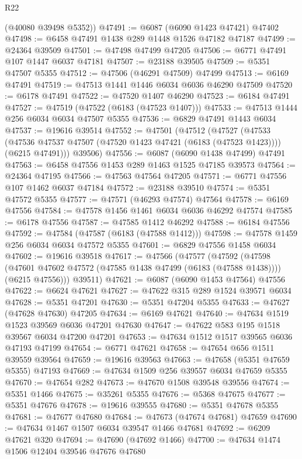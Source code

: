 \begin{lexlean}{R22}
\begin{coremodule}
      (@40080 @39498 @5352))
@47491 := @6087 (@6090 @1423 @47421) @47402
@47498 := @6458 @47491 @1438 @289 @1448 @1526 @47182 @47187
@47499 := @24364 @39509
@47501 := @47498 @47499 @47205
@47506 := @6771 @47491 @107 @1447 @6037 @47181
@47507 := @23188 @39505
@47509 := @5351 @47507 @5355
@47512 := @47506 (@46291 @47509) @47499
@47513 := @6169 @47491
@47519 := @47513 @1441 @1446 @6034 @6036 @46290 @47509
@47520 := @6178 @47491
@47522 := @47520 @1407 @46290
@47523 := @6184 @47491
@47527 := @47519 (@47522 (@6183 (@47523 @1407)))
@47533 := @47513 @1444 @256 @6034 @6034 @47507 @5355
@47536 := @6829 @47491 @1443 @6034
@47537 := @19616 @39514
@47552 := @47501
    (@47512
      (@47527
        (@47533 (@47536 @47537 @47507 (@47520 @1423 @47421 (@6183 (@47523 @1423)))) (@6215 @47491)))
      @39506)
@47556 := @6087 (@6090 @1438 @47499) @47491
@47563 := @6458 @47556 @1453 @289 @1463 @1525 @47185 @39573
@47564 := @24364 @47195
@47566 := @47563 @47564 @47205
@47571 := @6771 @47556 @107 @1462 @6037 @47184
@47572 := @23188 @39510
@47574 := @5351 @47572 @5355
@47577 := @47571 (@46293 @47574) @47564
@47578 := @6169 @47556
@47584 := @47578 @1456 @1461 @6034 @6036 @46292 @47574
@47585 := @6178 @47556
@47587 := @47585 @1412 @46292
@47588 := @6184 @47556
@47592 := @47584 (@47587 (@6183 (@47588 @1412)))
@47598 := @47578 @1459 @256 @6034 @6034 @47572 @5355
@47601 := @6829 @47556 @1458 @6034
@47602 := @19616 @39518
@47617 := @47566
    (@47577
      (@47592
        (@47598 (@47601 @47602 @47572 (@47585 @1438 @47499 (@6183 (@47588 @1438)))) (@6215 @47556)))
      @39511)
@47621 := @6087 (@6090 @1453 @47564) @47556
@47622 := @6624 @47621
@47627 := @47622 @315 @289 @1524 @39571 @6034
@47628 := @5351 @47201
@47630 := @5351 @47204 @5355
@47633 := @47627 (@47628 @47630) @47205
@47634 := @6169 @47621
@47640 := @47634 @1519 @1523 @39569 @6036 @47201 @47630
@47647 := @47622 @583 @195 @1518 @39567 @6034 @47200 @47201
@47653 := @47634 @1512 @1517 @39565 @6036 @47193 @47199
@47654 := @6771 @47621
@47658 := @47654 @656 @1511 @39559 @39564
@47659 := @19616 @39563
@47663 := @47658 (@5351 @47659 @5355) @47193
@47669 := @47634 @1509 @256 @39557 @6034 @47659 @5355
@47670 := @47654 @282
@47673 := @47670 @1508 @39548 @39556
@47674 := @5351 @1466
@47675 := @35261 @5355
@47676 := @5368 @47675
@47677 := @5351 @47676
@47678 := @19616 @39555
@47680 := @5351 @47678 @5355
@47681 := @47677 @47680
@47684 := @47673 (@47674 @47681) @47659
@47690 := @47634 @1467 @1507 @6034 @39547 @1466 @47681
@47692 := @6209 @47621 @320
@47694 := @47690 (@47692 @1466)
@47700 := @47634 @1474 @1506 @12404 @39546 @47676 @47680

\end{coremodule}
\end{lexlean}
